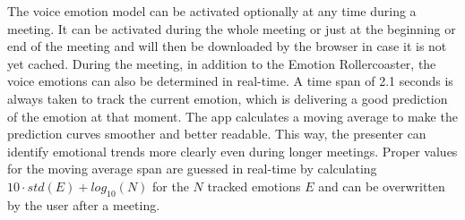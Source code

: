 The voice emotion model can be activated optionally at any time during a meeting. It can be activated during the whole meeting or just at the beginning or end of the meeting and will then be downloaded by the browser in case it is not yet cached. During the meeting, in addition to the Emotion Rollercoaster, the voice emotions can also be determined in real-time. A time span of 2.1 seconds is always taken to track the current emotion, which is delivering a good prediction of the emotion at that moment. The app calculates a moving average to make the prediction curves smoother and better readable. This way, the presenter can identify emotional trends more clearly even during longer meetings. Proper values for the moving average span are guessed in real-time by calculating $10 \cdot std(E) + log_{10}(N)$ for the $N$ tracked emotions $E$ and can be overwritten by the user after a meeting.
